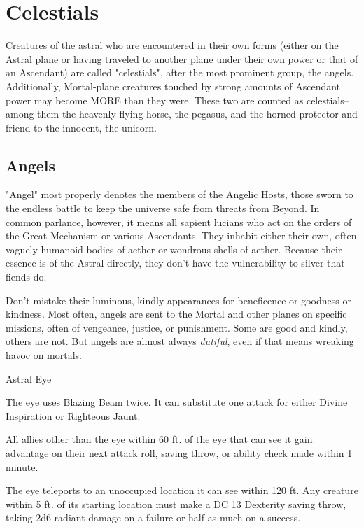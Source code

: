 \FloatBarrier
\section{Celestials}
Creatures of the astral who are encountered in their own forms (either on the Astral plane or having traveled to another plane under their own power or that of an Ascendant) are called "celestials", after the most prominent group, the angels. Additionally, Mortal-plane creatures touched by strong amounts of Ascendant power may become MORE than they were. These two are counted as celestials--among them the heavenly flying horse, the pegasus, and the horned protector and friend to the innocent, the unicorn.
\subsection{Angels}
"Angel" most properly denotes the members of the Angelic Hosts, those sworn to the endless battle to keep the universe safe from threats from Beyond. In common parlance, however, it means all sapient lucians who act on the orders of the Great Mechanism or various Ascendants. They inhabit either their own, often vaguely humanoid bodies of aether or wondrous shells of aether. Because their essence is of the Astral directly, they don't have the vulnerability to silver that fiends do.

Don't mistake their luminous, kindly appearances for beneficence or goodness or kindness. Most often, angels are sent to the Mortal and other planes on specific missions, often of vengeance, justice, or punishment. Some are good and kindly, others are not. But angels are almost always \textit{dutiful}, even if that means wreaking havoc on mortals.

\begin{DndMonster}{Astral Eye}
	\DndMonsterBasics[armor-class={13}, hit-points={45}, speed={0 ft., fly 50 ft. (hover)}]
	\DndMonsterDetails[skills={Perception +9}, damage-resistances={fire, radiant}, condition-immunities={broken, charmed, frightened}, senses={truesight 60 ft., blindsight 60 ft., passive Perception 19}, languages={all, telepathy 60 ft.}, challenge={1:1}]
	
	
	 The eye uses Blazing Beam twice. It can substitute one attack for either Divine Inspiration or Righteous Jaunt.
	
	\DndMonsterAttack[
		name=Blazing Beam,
		distance=ranged,
		type=spell,
		mod=+5,
		range=120 ft.,
		dmg=\DndDice{1d6+3},
		dmg-type=radiant
	]
	 All allies other than the eye within 60 ft. of the eye that can see it gain advantage on their next attack roll, saving throw, or ability check made within 1 minute.
	
	 The eye teleports to an unoccupied location it can see within 120 ft. Any creature within 5 ft. of its starting location must make a DC 13 Dexterity saving throw, taking 2d6 radiant damage on a failure or half as much on a success. 
\end{DndMonster}

